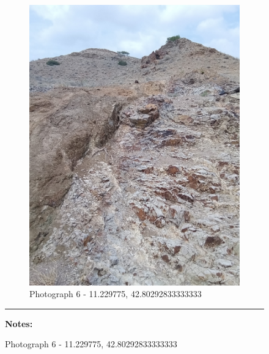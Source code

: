 \documentclass[12pt, letterpaper]{article}
\begin{document}
\begin{figure}[h]
{{                \begin{subfigure}{\linewidth}
                    \centering
                    \includegraphics[width=0.37\textheight, angle=-90]{photos/4.png}
                    \captionsetup{width=0.8\linewidth}
                    \caption{Photograph 6 - 11.229775, 42.80292833333333}
                \end{subfigure}

                    \vspace{\baselineskip}

                    \hrule
                    \begin{minipage}[c][3.5cm][t]{0.4\textwidth} %
                            \begin{minipage}[t][1.5cm][t]{0.4\textwidth} %
                            \vspace{2mm}
                            \hspace{2mm}
                                \raggedright
                                \textbf{\small{Notes:} \footnotesize{}}


\end{minipage}
\end{minipage}}}
\end{figure}
\end{document}
